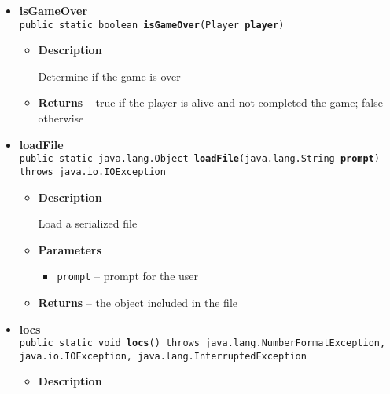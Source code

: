 {{{{{\begin{itemize}
{\begin{itemize}
{Get the user's input with line break as the delimiter
}
\item{
{\bf  Parameters}
  \begin{itemize}
   \item{
\texttt{prompt} -- prompt for the user}
  \end{itemize}
}%
\item{{\bf  Returns} -- 
the string user entered 
}%
\end{itemize}
}%
\item{ 
{\bf  isGameOver}\\
\texttt{public static boolean\ {\bf  isGameOver}(\texttt{Player} {\bf  player})
\label{personOfInterest.Game.isGameOver(personOfInterest.Player)}}%
\begin{itemize}
\item{
{\bf  Description}

Determine if the game is over
}
\item{{\bf  Returns} -- 
true if the player is alive and not completed the game; false otherwise 
}%
\end{itemize}
}%
\item{ 
{\bf  loadFile}\\
\texttt{public static java.lang.Object\ {\bf  loadFile}(\texttt{java.lang.String} {\bf  prompt}) throws java.io.IOException
\label{personOfInterest.Game.loadFile(java.lang.String)}}%
\begin{itemize}
\item{
{\bf  Description}

Load a serialized file
}
\item{
{\bf  Parameters}
  \begin{itemize}
   \item{
\texttt{prompt} -- prompt for the user}
  \end{itemize}
}%
\item{{\bf  Returns} -- 
the object included in the file 
}%
\end{itemize}
}%
\item{ 
{\bf  locs}\\
\texttt{public static void\ {\bf  locs}() throws java.lang.NumberFormatException, java.io.IOException, java.lang.InterruptedException
\label{personOfInterest.Game.locs()}}%
\begin{itemize}
\item{
{\bf  Description}

}
\end{itemize}}
\end{itemize}}}}}}
